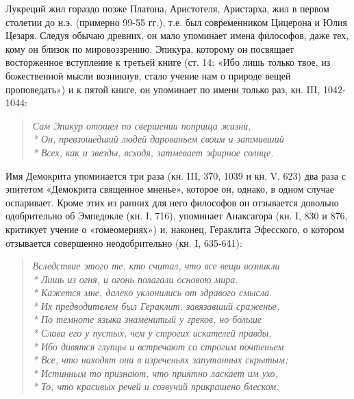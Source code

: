 Лукреций жил гораздо позже Платона, Аристотеля, Аристарха, жил в
первом столетии до н.э. (примерно 99-55 гг.), т.е. был современником
Цицерона и Юлия Цезаря. Следуя обычаю древних, он мало упоминает имена
философов, даже тех, кому он близок по мировоззрению. Эпикура,
которому он посвящает восторженное вступление к третьей книге (ст. 14:
«Ибо лишь только твое, из божественной мысли возникнув, стало учение
нам о природе вещей проповедать») и к пятой книге, он упоминает по
имени только раз, кн. III, 1042-1044:

\begin{verse}

    \emph{Сам Эпикур отошел по свершении поприща жизни,\\*
    Он, превзошедший людей дарованьем своим и затмивший\\*
    Всех, как и звезды, всходя, затмевает эфирное солнце.}

\end{verse}

Имя Демокрита упоминается три раза (кн. III, 370, 1039 и кн. V, 623)
два раза с эпитетом «Демокрита священное мненье», которое он, однако,
в одном случае оспаривает. Кроме этих из ранних для него философов он
отзывается довольно одобрительно об Эмпедокле (кн. I, 716), упоминает
Анаксагора (кн. I, 830 и 876, критикует учение о «гомеомериях») и,
наконец, Гераклита Эфесского, о котором отзывается совершенно
неодобрительно (кн. I, 635-641):

\begin{verse}

    \emph{Вследствие этого те, кто считал, что все вещи возникли\\*
    Лишь из огня, и огонь полагали основою мира.\\*
    Кажется мне, далеко уклонились от здравого смысла.\\*
    Их предводителем был Гераклит, завязавший сраженье,\\*
    По темноте языка знаменитый у греков, но больше\\*
    Слава его у пустых, чем у строгих искателей правды,\\*
    Ибо дивятся глупцы и встречают со строгим почтеньем\\*
    Все, что находят они в изреченьях запутанных скрытым;\\*
    Истинным то признают, что приятно ласкает им ухо,\\*
    То, что красивых речей и созвучий прикрашено блеском.}

\end{verse}

